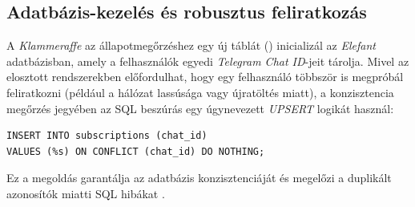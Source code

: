 \documentclass[12pt]{article}
\begin{document}
	\subsection{Adatbázis-kezelés és robusztus feliratkozás}
	
	A \textit{Klammeraffe} az állapotmegőrzéshez egy új táblát () inicializál az \textit{Elefant} adatbázisban, amely a felhasználók egyedi \textit{Telegram Chat ID}-jeit tárolja. Mivel az elosztott rendszerekben előfordulhat, hogy egy felhasználó többször is megpróbál feliratkozni (például a hálózat lassúsága vagy újratöltés miatt), a konzisztencia megőrzés jegyében az SQL beszúrás egy úgynevezett \textit{UPSERT} logikát használ:
	
	\begin{verbatim}
INSERT INTO subscriptions (chat_id) 
VALUES (%s) ON CONFLICT (chat_id) DO NOTHING;
	\end{verbatim}
	
	Ez a megoldás garantálja az adatbázis konzisztenciáját és megelőzi a duplikált azonosítók miatti SQL hibákat \cite{sql-on-conflict}.
	
\end{document}
